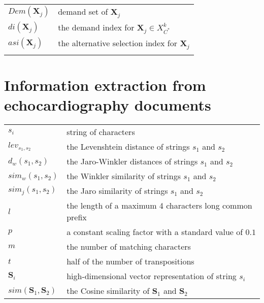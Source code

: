 \begin{tabular}{lp{10cm}}
	$Dem(\textbf{X}_j)$            & demand set of $\textbf{X}_j$                                                                                 \\
	$di(\textbf{X}_j)$             & the demand index for $\textbf{X}_j \in X_{C^*}^{k}$                                                          \\
	$asi(\textbf{X}_j)$            & the alternative selection index for $\textbf{X}_j$                                                           \\                                                                       \\    
\end{tabular}

\section*{Information extraction from echocardiography documents}

\begin{tabular}{lp{10cm}}
        $s_i$ & string of characters \\
        
	$lev_{s_1,s_2}$                  & the Levenshtein distance of strings $s_1$ and $s_2$        \\
	$d_w(s_1,s_2)$                   & the Jaro-Winkler distances of strings $s_1$ and $s_2$      \\
	$sim_w(s_1,s_2)$                 & the Winkler similarity of strings $s_1$ and $s_2$          \\
	$sim_j(s_1,s_2)$                 & the Jaro similarity of strings $s_1$ and $s_2$             \\
	$l$                              & the length of a maximum 4 characters long common prefix    \\
	$p$                              & a constant scaling factor with a standard value of $0.1$   \\
	$m$                              & the number of matching characters                          \\
	$t$                              & half of the number of transpositions                       \\
	$\textbf{S}_i$                   & high-dimensional vector representation of string $s_i$    \\
	$sim(\textbf{S}_1,\textbf{S}_2)$ & the Cosine similarity of $\textbf{S}_1$ and $\textbf{S}_2$ \\    
\end{tabular}